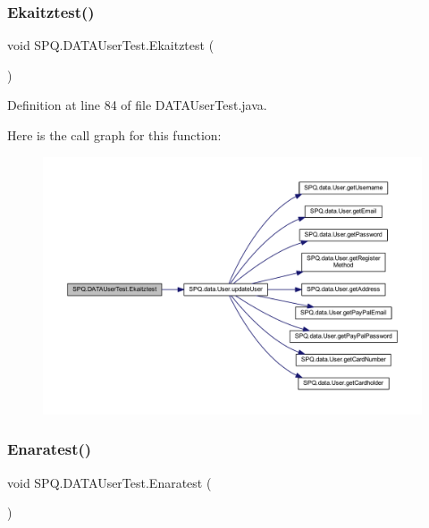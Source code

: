 \subsubsection{\texorpdfstring{Ekaitztest()}{Ekaitztest()}}
{\footnotesize\ttfamily void S\+P\+Q.\+D\+A\+T\+A\+User\+Test.\+Ekaitztest (\begin{DoxyParamCaption}{ }\end{DoxyParamCaption})}



Definition at line 84 of file D\+A\+T\+A\+User\+Test.\+java.

Here is the call graph for this function\+:
\nopagebreak
\begin{figure}[H]
\begin{center}
\leavevmode
\includegraphics[width=350pt]{class_s_p_q_1_1_d_a_t_a_user_test_a04242b7156b6bb7828bd569de8027fad_cgraph}
\end{center}
\end{figure}
\mbox{\label{class_s_p_q_1_1_d_a_t_a_user_test_a84d1c3d3992383e1cb93d07241cf3f02}} 
\subsubsection{\texorpdfstring{Enaratest()}{Enaratest()}}
{\footnotesize\ttfamily void S\+P\+Q.\+D\+A\+T\+A\+User\+Test.\+Enaratest (\begin{DoxyParamCaption}{ }\end{DoxyParamCaption})}



